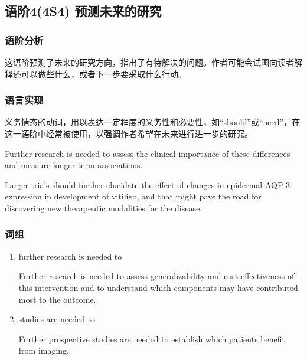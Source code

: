 \documentclass[a4paper]{ctexbook}
\begin{document}
  \subsection{语阶4(4S4) 预测未来的研究}
    \subsubsection{语阶分析}

    这语阶预测了未来的研究方向，指出了有待解决的问题。作者可能会试图向读者解释还可以做些什么，或者下一步要采取什么行动。

    \subsubsection{语言实现}

    义务情态的动词，用以表达一定程度的义务性和必要性，如“should”或“need”，在这一语阶中经常被使用，以强调作者希望在未来进行进一步的研究。

    \begin{eg}{}
      Further research \uline{is needed} to assess the clinical importance of these differences and measure longer-term associations.  
    \end{eg}

    \begin{eg}{}
      Larger trials \uline{should} further elucidate the effect of changes in epidermal AQP-3 expression in development of vitiligo, and that might pave the road for discovering new therapeutic modalities for the disease. 
    \end{eg}

    \subsubsection{词组}

    \begin{enumerate}
      \item further research is needed to
      \begin{eg}{}
        \uline{Further research is needed to} assess generalizability and cost-effectiveness of this intervention and to understand which components may have contributed most to the outcome. 
      \end{eg}

      \item studies are needed to
      \begin{eg}{}
        Further prospective \uline{studies are needed to} establish which patients benefit from imaging.  
      \end{eg}

    \end{enumerate}
\end{document}
